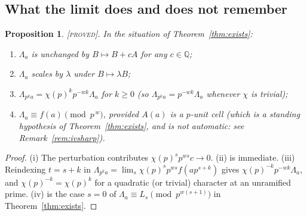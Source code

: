 \documentclass[11pt,reqno]{article}
\newcommand{\QQ}{\mathbb{Q}}
\newcommand{\PROVED}{{\normalfont\textsc{[proved]}}}
\newcommand{\VER}[1]{{\normalfont\textsc{[verified:} #1\textsc{]}}}
\theoremstyle{plain}
\newtheorem{proposition}[theorem]{Proposition}
\theoremstyle{definition}
\theoremstyle{remark}
\numberwithin{equation}{section}
\begin{document}
\subsection{What the limit does and does not remember}\label{ss:invariance}

\begin{proposition}\label{prop:invariance}
\PROVED.  In the situation of Theorem~\ref{thm:exists}:
\begin{enumerate}[label=(\roman*),leftmargin=2em]
\item $\Lambda_a$ is unchanged by $B\mapsto B+cA$ for any $c\in\QQ$;
\item $\Lambda_a$ scales by $\lambda$ under $B\mapsto\lambda B$;
\item $\Lambda_{p^ka}=\chi(p)^{k}p^{-wk}\Lambda_a$ for $k\ge0$ (so
  $\Lambda_{p^ka}=p^{-wk}\Lambda_a$ whenever $\chi$ is trivial);
\item $\Lambda_a\equiv f(a)\pmod{p^{\,w}}$, \emph{provided} $A(a)$ is a $p$-unit cell (which is
  a standing hypothesis of Theorem~\ref{thm:exists}, and is not automatic: see
  Remark~\ref{rem:ivsharp}).
\end{enumerate}
\end{proposition}

\begin{proof}
(i) The perturbation contributes $\chi(p)^sp^{ws}c\to0$.  (ii) is immediate.
(iii) Reindexing $t=s+k$ in
$\Lambda_{p^ka}=\lim_s\chi(p)^{s}p^{ws}f(ap^{s+k})$ gives
$\chi(p)^{-k}p^{-wk}\Lambda_a$, and $\chi(p)^{-k}=\chi(p)^{k}$ for a quadratic
(or trivial) character at an unramified prime.  (iv) is the case $s=0$ of
$\Lambda_a\equiv L_s\pmod{p^{w(s+1)}}$ in Theorem~\ref{thm:exists}.
\end{proof}
\end{document}

